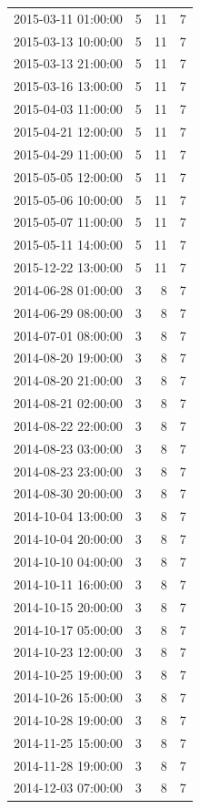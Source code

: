 \begin{tabular}{lrrr}
2015-03-11 01:00:00 & 5 & 11 & 7 \\
2015-03-13 10:00:00 & 5 & 11 & 7 \\
2015-03-13 21:00:00 & 5 & 11 & 7 \\
2015-03-16 13:00:00 & 5 & 11 & 7 \\
2015-04-03 11:00:00 & 5 & 11 & 7 \\
2015-04-21 12:00:00 & 5 & 11 & 7 \\
2015-04-29 11:00:00 & 5 & 11 & 7 \\
2015-05-05 12:00:00 & 5 & 11 & 7 \\
2015-05-06 10:00:00 & 5 & 11 & 7 \\
2015-05-07 11:00:00 & 5 & 11 & 7 \\
2015-05-11 14:00:00 & 5 & 11 & 7 \\
2015-12-22 13:00:00 & 5 & 11 & 7 \\
2014-06-28 01:00:00 & 3 & 8 & 7 \\
2014-06-29 08:00:00 & 3 & 8 & 7 \\
2014-07-01 08:00:00 & 3 & 8 & 7 \\
2014-08-20 19:00:00 & 3 & 8 & 7 \\
2014-08-20 21:00:00 & 3 & 8 & 7 \\
2014-08-21 02:00:00 & 3 & 8 & 7 \\
2014-08-22 22:00:00 & 3 & 8 & 7 \\
2014-08-23 03:00:00 & 3 & 8 & 7 \\
2014-08-23 23:00:00 & 3 & 8 & 7 \\
2014-08-30 20:00:00 & 3 & 8 & 7 \\
2014-10-04 13:00:00 & 3 & 8 & 7 \\
2014-10-04 20:00:00 & 3 & 8 & 7 \\
2014-10-10 04:00:00 & 3 & 8 & 7 \\
2014-10-11 16:00:00 & 3 & 8 & 7 \\
2014-10-15 20:00:00 & 3 & 8 & 7 \\
2014-10-17 05:00:00 & 3 & 8 & 7 \\
2014-10-23 12:00:00 & 3 & 8 & 7 \\
2014-10-25 19:00:00 & 3 & 8 & 7 \\
2014-10-26 15:00:00 & 3 & 8 & 7 \\
2014-10-28 19:00:00 & 3 & 8 & 7 \\
2014-11-25 15:00:00 & 3 & 8 & 7 \\
2014-11-28 19:00:00 & 3 & 8 & 7 \\
2014-12-03 07:00:00 & 3 & 8 & 7 \\

\end{tabular}
